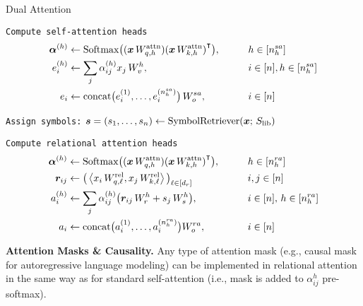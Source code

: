 \begin{algorithm}[ht!]
	\caption{Dual Attention}\label{alg:dual_head_attn}

    \vspace{1em}

    \texttt{Compute self-attention heads}
    \begin{align*}
        \bm{\alpha}^{(h)} &\gets \mathrm{Softmax}\big({(\bm{x} \, W_{q, h}^{\mathrm{attn}})} {(\bm{x} \, W_{k, h}^{\mathrm{attn}})}^\intercal\big), \qquad && h \in [n_h^{sa}] \\
        e_i^{(h)} &\gets \sum_{j} \alpha_{ij}^{(h)} x_j \, W_v^h, \qquad && i \in [n], h \in [n_h^{sa}]\\
        e_i &\gets \mathrm{concat}\big(e_i^{(1)}, \ldots, e_i^{(n_h^{sa})}\big) \, W_o^{sa}, && i \in [n]
    \end{align*}

    \texttt{Assign symbols:} $\bm{s} = (s_1, \ldots, s_n) \gets \mathrm{SymbolRetriever}(\bm{x};\,S_\mathrm{lib})$
    \vspace{0.5em}

    \texttt{Compute relational attention heads}
    \begin{align*}
        \bm{\alpha}^{(h)} &\gets \mathrm{Softmax}\big({(\bm{x} \, W_{q, h}^{\mathrm{attn}})} {(\bm{x} \, W_{k, h}^{\mathrm{attn}})}^\intercal\big), \qquad && h \in [n_h^{ra}] \\
        \bm{r}_{ij} &\gets \big(\left \langle x_i \, W_{q, \ell}^{\mathrm{rel}}, x_j \, W_{k, \ell}^{\mathrm{rel}} \right\rangle\big)_{\ell \in [d_r]} \qquad && i,j \in [n] \\
        a_i^{(h)} &\gets \sum_{j} \alpha_{ij}^{(h)} \big(\bm{r}_{ij}\,W_r^h + s_j \, W_s^{h}\big), \qquad && i \in [n],\, h \in [n_h^{ra}]\\
        a_i &\gets \mathrm{concat}\big(a_i^{(1)}, \ldots, a_i^{(n_h^{ra})}\big) W_o^{ra}, && i \in [n]
    \end{align*}


\end{algorithm}


\textbf{Attention Masks \& Causality.} Any type of attention mask (e.g., causal mask for autoregressive language modeling) can be implemented in relational attention in the same way as for standard self-attention (i.e., mask is added to $\alpha_{ij}^h$ pre-softmax).

